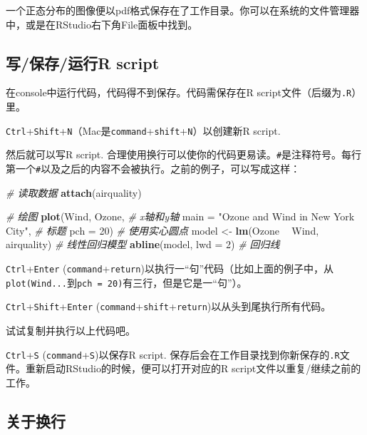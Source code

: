 \documentclass[]{book}
\newenvironment{Shaded}{\begin{snugshade}}{\end{snugshade}}
\newcommand{\CommentTok}[1]{\textcolor[rgb]{0.56,0.35,0.01}{\textit{#1}}}
\newcommand{\DataTypeTok}[1]{\textcolor[rgb]{0.13,0.29,0.53}{#1}}
\newcommand{\DecValTok}[1]{\textcolor[rgb]{0.00,0.00,0.81}{#1}}
\newcommand{\KeywordTok}[1]{\textcolor[rgb]{0.13,0.29,0.53}{\textbf{#1}}}
\newcommand{\NormalTok}[1]{#1}
\newcommand{\OperatorTok}[1]{\textcolor[rgb]{0.81,0.36,0.00}{\textbf{#1}}}
\newcommand{\StringTok}[1]{\textcolor[rgb]{0.31,0.60,0.02}{#1}}
\begin{document}
一个正态分布的图像便以pdf格式保存在了工作目录。你可以在系统的文件管理器中，或是在RStudio右下角File面板中找到。

\hypertarget{r-script}{%
\subsection{写/保存/运行R script}\label{r-script}}

在console中运行代码，代码得不到保存。代码需保存在R script文件（后缀为\texttt{.R}）里。

\texttt{Ctrl}+\texttt{Shift}+\texttt{N}（Mac是\texttt{command}+\texttt{shift}+\texttt{N}）以创建新R script.

然后就可以写R script. 合理使用换行可以使你的代码更易读。\texttt{\#}是注释符号。每行第一个\texttt{\#}以及之后的内容不会被执行。之前的例子，可以写成这样：

\begin{Shaded}
\begin{Highlighting}[]
\CommentTok{# 读取数据}
\KeywordTok{attach}\NormalTok{(airquality)}

\CommentTok{# 绘图}
\KeywordTok{plot}\NormalTok{(Wind, Ozone, }\CommentTok{# x轴和y轴}
     \DataTypeTok{main =} \StringTok{"Ozone and Wind in New York City"}\NormalTok{, }\CommentTok{# 标题}
     \DataTypeTok{pch =} \DecValTok{20}\NormalTok{) }\CommentTok{# 使用实心圆点}
\NormalTok{model <-}\StringTok{ }\KeywordTok{lm}\NormalTok{(Ozone }\OperatorTok{~}\StringTok{ }\NormalTok{Wind, airquality) }\CommentTok{# 线性回归模型}
\KeywordTok{abline}\NormalTok{(model, }\DataTypeTok{lwd =} \DecValTok{2}\NormalTok{) }\CommentTok{# 回归线}
\end{Highlighting}
\end{Shaded}

\texttt{Ctrl}+\texttt{Enter} (\texttt{command}+\texttt{return})以执行一``句''代码（比如上面的例子中，从\texttt{plot(Wind...}到\texttt{pch\ =\ 20)}有三行，但是它是一``句''）。

\texttt{Ctrl}+\texttt{Shift}+\texttt{Enter} (\texttt{command}+\texttt{shift}+\texttt{return})以从头到尾执行所有代码。

试试复制并执行以上代码吧。

\texttt{Ctrl}+\texttt{S} (\texttt{command}+\texttt{S})以保存R script. 保存后会在工作目录找到你新保存的\texttt{.R}文件。重新启动RStudio的时候，便可以打开对应的R script文件以重复/继续之前的工作。

\subsection{关于换行}
\end{document}
